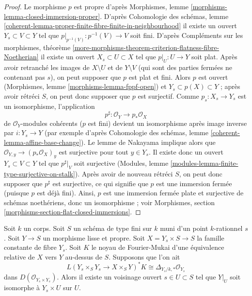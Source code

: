 \begin{proof}
Le morphisme $p$ est propre d'après Morphismes, lemme
\ref{morphisms-lemma-closed-immersion-proper}.
D'après Cohomologie des schémas, lemme
\ref{coherent-lemma-proper-finite-fibre-finite-in-neighbourhood}
il existe un ouvert $Y_s \subset V \subset Y$ tel que
$p|_{p^{-1}(V)} : p^{-1}(V) \to V$ soit fini.
D'après Compléments sur les morphismes, théorème
\ref{more-morphisms-theorem-criterion-flatness-fibre-Noetherian}
il existe un ouvert $X_s \subset U \subset X$ tel que
$p|_U : U \to Y$ soit plat. Après avoir retranché les images de
$X \setminus U$ et de $Y \setminus V$ (qui sont des parties fermées
ne contenant pas $s$), on peut supposer que $p$ est plat et fini.
Alors $p$ est ouvert (Morphismes, lemme \ref{morphisms-lemma-fppf-open})
et $Y_s \subset p(X) \subset Y$ ; après avoir rétréci $S$,
on peut donc supposer que $p$ est surjectif.
Comme $p_s : X_s \to Y_s$ est un isomorphisme, l'application
$$
p^\sharp : \mathcal{O}_Y \longrightarrow p_*\mathcal{O}_X
$$
de $\mathcal{O}_Y$-modules cohérents ($p$ est fini)
devient un isomorphisme après image inverse par $i : Y_s \to Y$
(par exemple d'après Cohomologie des schémas, lemme
\ref{coherent-lemma-affine-base-change}).
Le lemme de Nakayama implique alors que
$\mathcal{O}_{Y, y} \to (p_*\mathcal{O}_X)_y$ est surjective
pour tout $y \in Y_s$. Il existe donc un ouvert $Y_s \subset V \subset Y$
tel que $p^\sharp|_V$ soit surjective
(Modules, lemme \ref{modules-lemma-finite-type-surjective-on-stalk}).
Après avoir de nouveau rétréci $S$, on peut donc supposer que
$p^\sharp$ est surjective, ce qui signifie que $p$ est une immersion
fermée (puisque $p$ est déjà fini).
Ainsi, $p$ est une immersion fermée plate et surjective
de schémas noethériens, donc un isomorphisme ; voir
Morphismes, section \ref{morphisms-section-flat-closed-immersions}.
\end{proof}

\begin{lemma}
\label{lemma-no-deformations}
Soit $k$ un corps. Soit $S$ un schéma de type fini sur $k$
muni d'un point $k$-rationnel $s$. Soit $Y \to S$ un morphisme lisse et propre.
Soit $X = Y_s \times S \to S$ la famille constante de fibre
$Y_s$. Soit $K$ le noyau de Fourier-Mukai d'une équivalence relative
de $X$ vers $Y$ au-dessus de $S$. Supposons que l'on ait
$$
L(Y_s \times_S Y_s \to X \times_S Y)^*K \cong 
\Delta_{Y_s/k, *} \mathcal{O}_{Y_s}
$$
dans $D(\mathcal{O}_{Y_s \times Y_s})$. Alors il existe un voisinage ouvert
$s \in U \subset S$ tel que $Y|_U$ soit isomorphe à $Y_s \times U$ sur $U$.
\end{lemma}


